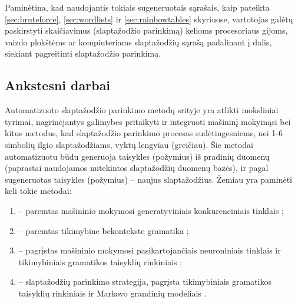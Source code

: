 \documentclass{VUMIFInfBakalaurinis}
\begin{document}
Paminėtina, kad naudojantis tokiais sugeneruotais sąrašais, kaip pateikta 
\ref{sec:bruteforce}, \ref{sec:wordlists} ir \ref{sec:rainbowtables} skyriuose, 
vartotojas galėtų paskirstyti skaičiavimus (slaptažodžio parinkimą) kelioms 
procesoriaus gijoms, vaizdo plokštėms ar kompiuteriams slaptažodžių sąrašą 
padalinant į dalis, siekiant pagreitinti slaptažodžio parinkimą.

% 

\subsection{Ankstesni darbai}
Automatizuoto slaptažodžio parinkimo metodų srityje yra atlikti moksliniai 
tyrimai, nagrinėjantys galimybes pritaikyti ir integruoti mašininį mokymąsi bei 
kitus metodus, kad slaptažodžio parinkimo procesas sudėtingesniems, nei 1-6 
simbolių ilgio slaptažodžiams, vyktų lengviau (greičiau). Šie metodai 
automatizuotu būdu generuoja taisykles (požymius) iš pradinių duomenų (paprastai 
naudojamos nutekintos slaptažodžių duomenų bazės), ir pagal sugeneruotas 
taisykles (požymius) -- naujus slaptažodžius. Žemiau yra paminėti keli tokie 
metodai:
\begin{enumerate}
  \item {} -- paremtas mašininio mokymosi generatyviniais 
    konkurenciniais tinklais \cite{PassGAN};
  \item {} -- paremtas tikimybine bekontekste gramatika 
    \cite{PCFG1,PCFG2};
  \item {} -- pagrįstas mašininio mokymosi pasikartojančiais 
    neuroniniais tinklais ir tikimybiniais gramatikos taisyklių rinkiniais 
    \cite{GenPASS};
  \item {} -- slaptažodžių parinkimo strategija, pagrįsta 
    tikimybiniais gramatikos taisyklių rinkiniais ir Markovo grandinių modeliais 
    \cite{TG-SPSR}.
\end{enumerate}
\end{document}
